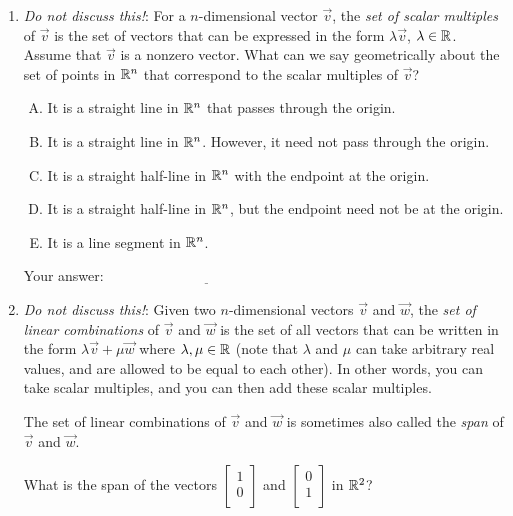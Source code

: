 \documentclass[10pt]{amsart}
\begin{document}
\begin{enumerate}
\item {\em Do not discuss this!}: For a $n$-dimensional vector
  $\vec{v}$, the {\em set of scalar multiples} of $\vec{v}$ is the set
  of vectors that can be expressed in the form $\lambda \vec{v}$,
  $\lambda \in \mathbb{R}$. Assume that $\vec{v}$ is a nonzero vector. What
  can we say geometrically about the set of points in $\mathbb{R}^n$ that
  correspond to the scalar multiples of $\vec{v}$?

  \begin{enumerate}[(A)]
  \item It is a straight line in $\mathbb{R}^n$ that passes through the
    origin.
  \item It is a straight line in $\mathbb{R}^n$. However, it need not pass
    through the origin.
  \item It is a straight half-line in $\mathbb{R}^n$ with the endpoint at the
    origin.
  \item It is a straight half-line in $\mathbb{R}^n$, but the endpoint need
    not be at the origin.
  \item It is a line segment in $\mathbb{R}^n$.
  \end{enumerate}

  \vspace{0.1in}
  Your answer: $\underline{\qquad\qquad\qquad\qquad\qquad\qquad\qquad}$
  \vspace{0.1in}

\item {\em Do not discuss this!}: Given two $n$-dimensional vectors
  $\vec{v}$ and $\vec{w}$, the {\em set of linear combinations} of
  $\vec{v}$ and $\vec{w}$ is the set of all vectors that can be
  written in the form $\lambda \vec{v} + \mu \vec{w}$ where
  $\lambda,\mu \in \mathbb{R}$ (note that $\lambda$ and $\mu$ can take
  arbitrary real values, and are allowed to be equal to each
  other). In other words, you can take scalar multiples, and you can
  then add these scalar multiples.

  The set of linear combinations of $\vec{v}$ and $\vec{w}$ is
  sometimes also called the {\em span} of $\vec{v}$ and $\vec{w}$.

  What is the span of the vectors $\left[\begin{matrix} 1 \\ 0
      \\\end{matrix}\right]$ and $\left[\begin{matrix} 0 \\ 1
      \\\end{matrix}\right]$ in $\mathbb{R}^2$?


\end{enumerate}
\end{document}
